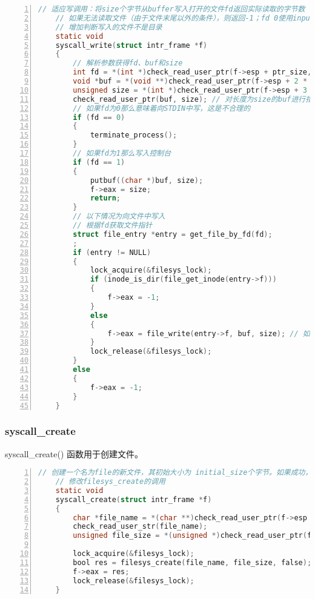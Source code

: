\documentclass{article}
\begin{document}
	\begin{lstlisting}[xleftmargin = 4em,xrightmargin = 4em, aboveskip = 1em, numbers = left, language = C,title=src/userprog/syscall.c - syscall\_create()]
    // 适应写调用：将size个字节从buffer写入打开的文件fd返回实际读取的字节数（文件末尾为0）
    // 如果无法读取文件（由于文件末尾以外的条件），则返回-1；fd 0使用input_getc()从键盘读取
    // 增加判断写入的文件不是目录
    static void
    syscall_write(struct intr_frame *f)
    {
        // 解析参数获得fd、buf和size
        int fd = *(int *)check_read_user_ptr(f->esp + ptr_size, sizeof(int));
        void *buf = *(void **)check_read_user_ptr(f->esp + 2 * ptr_size, ptr_size);
        unsigned size = *(int *)check_read_user_ptr(f->esp + 3 * ptr_size, sizeof(unsigned));
        check_read_user_ptr(buf, size); // 对长度为size的buf进行指针校验
        // 如果fd为0那么意味着向STDIN中写，这是不合理的
        if (fd == 0)
        {
            terminate_process();
        }
        // 如果fd为1那么写入控制台
        if (fd == 1)
        {
            putbuf((char *)buf, size);
            f->eax = size;
            return;
        }
        // 以下情况为向文件中写入
        // 根据fd获取文件指针
        struct file_entry *entry = get_file_by_fd(fd);
        ;
        if (entry != NULL)
        {
            lock_acquire(&filesys_lock);
            if (inode_is_dir(file_get_inode(entry->f)))
            {
                f->eax = -1;
            }
            else
            {
                f->eax = file_write(entry->f, buf, size); // 如果entry不为NULL那么将size个字节写入buf并返回size
            }
            lock_release(&filesys_lock);
        }
        else
        {
            f->eax = -1;
        }
    }
	\end{lstlisting}
	
	\subsubsection{syscall\_create}
	
	syscall\_create() 函数用于创建文件。
	
	\begin{lstlisting}[xleftmargin = 4em,xrightmargin = 4em, aboveskip = 1em, numbers = left, language = C,title=src/userprog/syscall.c - syscall\_create()]
    // 创建一个名为file的新文件，其初始大小为 initial_size个字节。如果成功，则返回true，否则返回false。创建新文件不会打开它：打开新文件是一项单独的操作，需要系统调用“open”。
    // 修改filesys_create的调用
    static void
    syscall_create(struct intr_frame *f)
    {
        char *file_name = *(char **)check_read_user_ptr(f->esp + ptr_size, ptr_size);
        check_read_user_str(file_name);
        unsigned file_size = *(unsigned *)check_read_user_ptr(f->esp + 2 * ptr_size, sizeof(unsigned));
        
        lock_acquire(&filesys_lock);
        bool res = filesys_create(file_name, file_size, false);
        f->eax = res;
        lock_release(&filesys_lock);
    }
	\end{lstlisting}
	
\end{document}
